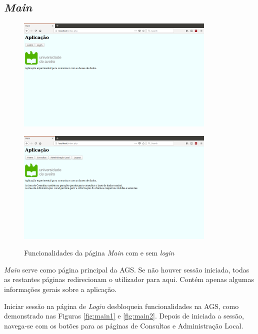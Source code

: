 \documentclass[11pt,twoside,a4paper]{report}
\begin{document}
\subsection{\textit{Main}}
\begin{figure}[H]
\centering
	\begin{minipage}{1.\textwidth}
		\begin{center}
			\includegraphics[width=0.85\textwidth]{main01} %
			\label{fig:main1}
		\end{center}
	\end{minipage}
	\begin{minipage}{1.\textwidth}
		\begin{center}
			\includegraphics[width=0.85\textwidth]{main02} %
			\label{fig:main2}
		\end{center}
	\end{minipage}
	\caption{Funcionalidades da página \textit{Main} com e sem \textit{login}}
	\label{fig:main0}
\end{figure}
\textit{Main} serve como página principal da AGS. Se não houver sessão iniciada, todas as restantes páginas redirecionam o utilizador para aqui. Contém apenas algumas informações gerais sobre a aplicação.\par 
Iniciar sessão na página de \textit{Login} desbloqueia funcionalidades na AGS, como demonstrado nas Figuras \ref{fig:main1} e \ref{fig:main2}. Depois de iniciada a sessão, navega-se com os botões para as páginas de Consultas e Administração Local.
\end{document}
